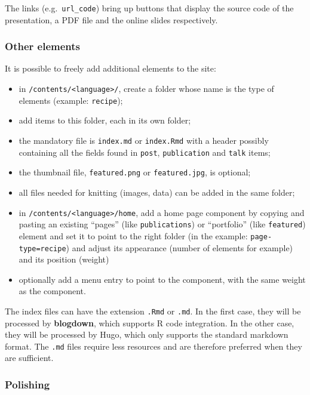 \documentclass[
  12pt,
  american,
  a4paper,
  extrafontsizes,onecolumn,openright
  ]{memoir}
\providecommand{\tightlist}{%
  \setlength{\itemsep}{0pt}\setlength{\parskip}{0pt}}
\begin{document}
The links (e.g.~\texttt{url\_code}) bring up buttons that display the source code of the presentation, a PDF file and the online slides respectively.

\hypertarget{other-elements}{%
\subsubsection{Other elements}\label{other-elements}}

It is possible to freely add additional elements to the site:

\begin{itemize}
\tightlist
\item
  in \texttt{/contents/\textless{}language\textgreater{}/}, create a folder whose name is the type of elements (example: \texttt{recipe});
\item
  add items to this folder, each in its own folder;
\item
  the mandatory file is \texttt{index.md} or \texttt{index.Rmd} with a header possibly containing all the fields found in \texttt{post}, \texttt{publication} and \texttt{talk} items;
\item
  the thumbnail file, \texttt{featured.png} or \texttt{featured.jpg}, is optional;
\item
  all files needed for knitting (images, data) can be added in the same folder;
\item
  in \texttt{/contents/\textless{}language\textgreater{}/home}, add a home page component by copying and pasting an existing \enquote{pages} (like \texttt{publications}) or \enquote{portfolio} (like \texttt{featured}) element and set it to point to the right folder (in the example: \texttt{page-type=recipe}) and adjust its appearance (number of elements for example) and its position (weight)
\item
  optionally add a menu entry to point to the component, with the same weight as the component.
\end{itemize}

The index files can have the extension \texttt{.Rmd} or \texttt{.md}.
In the first case, they will be processed by \textbf{blogdown}, which supports R code integration.
In the other case, they will be processed by Hugo, which only supports the standard markdown format.
The \texttt{.md} files require less resources and are therefore preferred when they are sufficient.

\hypertarget{polishing}{%
\subsubsection{Polishing}\label{polishing}}
\end{document}

